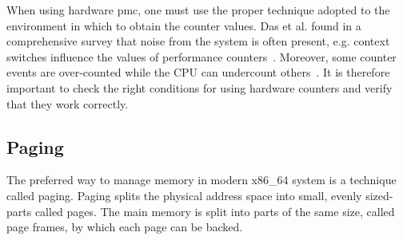 When using hardware \gls{pmc}, one must use the proper technique adopted to the
environment in which to obtain the counter values. Das et al. found in a
comprehensive survey that noise from the system is often present, e.g. context
switches influence the values of performance counters~\cite{das_sok_2019}.
Moreover, some counter events are over-counted while the CPU can undercount
others~\cite{weaver_non-determinism_2013}. It is therefore important to check
the right conditions for using hardware counters and verify that they work
correctly.

\subsection{Paging}
\label{sec:state:technical:paging}


The preferred way to manage memory in modern x86\_64 system is a technique
called paging. Paging splits the physical address space into small, evenly
sized-parts called pages. The main memory is split into parts of the same size,
called page frames, by which each page can be backed.

